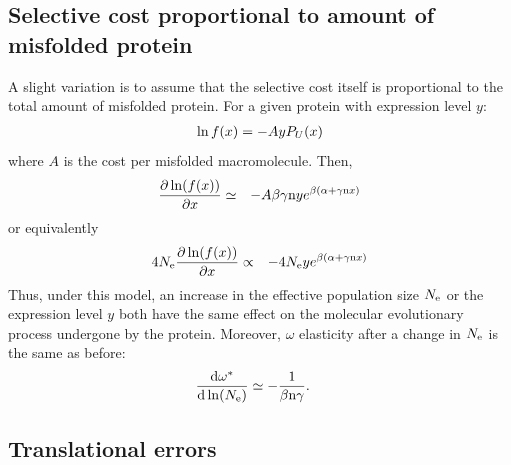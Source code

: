 \documentclass{article}
\begin{document}
\subsection{Selective cost proportional to amount of misfolded protein}

A slight variation is to assume that the selective cost itself is proportional to the total amount of misfolded protein. For a given protein with expression level $y$:
\begin{eqnarray}
\ln f(x) = - A y P_{U} (x)
\end{eqnarray}
where $A$ is the cost per misfolded macromolecule. Then, 
\begin{eqnarray}
\frac{\partial \ln (f(x))}{\partial x} &\simeq& -A \beta \gamma \text{n} y  e^{\beta(\alpha + \gamma \text{n} x)}
\end{eqnarray}
or equivalently
\begin{eqnarray}
4 N_{\mathrm{e}} \frac{\partial \ln (f(x))}{\partial x} &\propto& -4 N_{\mathrm{e}} y e^{\beta(\alpha + \gamma \text{n} x)}
\end{eqnarray}
Thus, under this model, an increase in the effective population size $N_{\mathrm{e}}$ or the expression level $y$ both have the same effect on the molecular evolutionary process undergone by the protein.
Moreover, $\omega$ elasticity after a change in $N_{\mathrm{e}}$ is the same as before:
\begin{align}
\frac{ \mathrm{d} \omega^{*}}{\mathrm{d} \ln (N_{\mathrm{e}})} & \simeq - \frac{1}{\beta \text{n} \gamma}.
\end{align}
\subsection{Translational errors}
\end{document}
